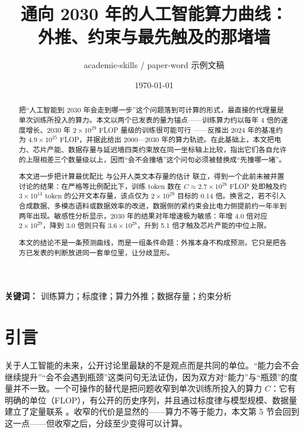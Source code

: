 \documentclass[11pt,a4paper]{article}
\title{\textbf{通向 2030 年的人工智能算力曲线：\\ 外推、约束与最先触及的那堵墙}}
\author{academic-skills / paper-word 示例文稿}
\date{\today}
\begin{document}
\maketitle

\begin{abstract}
\noindent
把“人工智能到 2030 年会走到哪一步”这个问题落到可计算的形式，最直接的代理量是单次训练所投入的算力。本文以两个已发表的量为锚点——训练算力约以每年 4 倍的速度增长、2030 年 $2\times10^{29}$ FLOP 量级的训练很可能可行 \citep{epoch2024}——反推出 2024 年的基准约为 $4.9\times10^{25}$ FLOP，并据此给出 2000—2030 年的算力轨迹。在此基础上，本文把电力、芯片产能、数据存量与延迟墙四类约束放在同一坐标轴上比较，指出它们各自允许的上限相差三个数量级以上，因而“会不会撞墙”这个问句必须被替换成“先撞哪一堵”。

本文进一步把计算最优配比 \citep{hoffmann2022} 与公开人类文本存量的估计 \citep{villalobos2024} 联立，得到一个此前未被并置讨论的结果：在严格等比例配比下，训练 token 数在 $C \approx 2.7\times10^{28}$ FLOP 处即触及约 $3\times10^{14}$ token 的公开文本存量，该点仅为 $2\times10^{29}$ 目标的 0.14 倍。换言之，若不引入合成数据、多模态语料或数据效率的改进，数据侧的紧约束会比电力侧提前约一年半到两年出现。敏感性分析显示，2030 年的结果对年增速极为敏感：年增 4.0 倍对应 $2\times10^{29}$，降到 3.0 倍则只有 $3.6\times10^{28}$，升到 5.1 倍才触及芯片产能的中位上限。

本文的结论不是一条预测曲线，而是一组条件命题：外推本身不构成预测，它只是把各方已发表的判断放进同一套单位里，让分歧显形。
\end{abstract}

\medskip
\noindent\textbf{关键词：} 训练算力；标度律；算力外推；数据存量；约束分析

\begin{center}\end{center}

\section{引言}

关于人工智能的未来，公开讨论里最缺的不是观点而是共同的单位。“能力会不会继续提升”“会不会遇到瓶颈”这类问句无法证伪，因为双方对“能力”与“瓶颈”的度量并不一致。一个可操作的替代是把问题收窄到单次训练所投入的算力 $C$：它有明确的单位（FLOP），有公开的历史序列，并且通过标度律与模型规模、数据量建立了定量联系 \citep{kaplan2020,hoffmann2022}。收窄的代价是显然的——算力不等于能力，本文第 5 节会回到这一点——但收窄之后，分歧至少变得可以计算。
\end{document}
